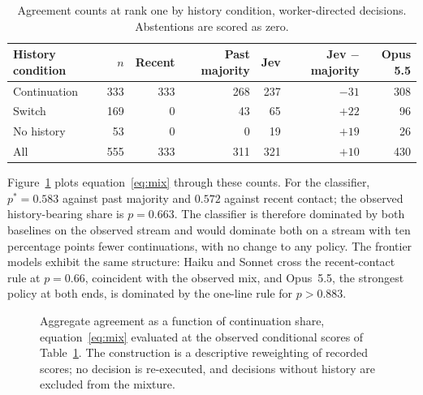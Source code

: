 \documentclass[11pt]{article}
\theoremstyle{definition}
\newcommand{\agr}[1]{A_{#1}}
\begin{document}
\begin{table}[t]
\centering\small
\caption{Agreement counts at rank one by history condition, worker-directed decisions. Abstentions are scored as zero.}
\label{tab:decomp}
\begin{tabular}{lrrrrrr}
\toprule
History condition & $n$ & Recent & Past majority & Jev & Jev $-$ majority & Opus 5.5 \\
\midrule
Continuation & 333 & 333 & 268 & 237 & $-31$ & 308 \\
Switch & 169 & 0 & 43 & 65 & $+22$ & 96 \\
No history & 53 & 0 & 0 & 19 & $+19$ & 26 \\
All & 555 & 333 & 311 & 321 & $+10$ & 430 \\
\bottomrule
\end{tabular}
\end{table}

Figure~\ref{fig:mix} plots equation~\ref{eq:mix} through these counts. For the classifier, $p^\ast = 0.583$ against past majority and $0.572$ against recent contact; the observed history-bearing share is $p = 0.663$. The classifier is therefore dominated by both baselines on the observed stream and would dominate both on a stream with ten percentage points fewer continuations, with no change to any policy. The frontier models exhibit the same structure: Haiku and Sonnet cross the recent-contact rule at $p = 0.66$, coincident with the observed mix, and Opus~5.5, the strongest policy at both ends, is dominated by the one-line rule for $p > 0.883$.

\begin{figure}[t]
\centering
{}
\caption{Aggregate agreement as a function of continuation share, equation~\ref{eq:mix} evaluated at the observed conditional scores of Table~\ref{tab:decomp}. The construction is a descriptive reweighting of recorded scores; no decision is re-executed, and decisions without history are excluded from the mixture.}
\label{fig:mix}
\end{figure}
\end{document}
